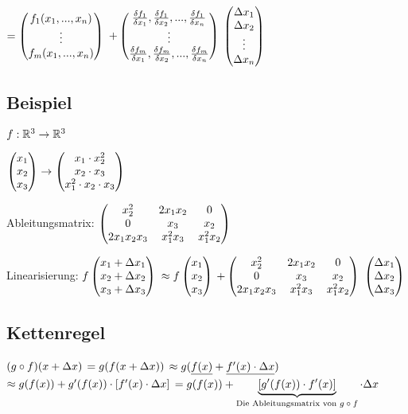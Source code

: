 $=  \begin{pmatrix} f_1(x_1,...,x_n)\\\vdots\\f_m(x_1,...,x_n) \end{pmatrix}  $
$+  \begin{pmatrix} \frac{\delta f_1}{\delta x_1}, \frac{\delta f_1}{\delta x_2}, ..., \frac{\delta f_1}{\delta x_n}\\ \vdots\\\frac{\delta f_m}{\delta x_1}, \frac{\delta f_m}{\delta x_2}, ..., \frac{\delta f_m}{\delta x_n} \end{pmatrix} $
$ \begin{pmatrix} \Delta x_1\\\Delta x_2\\\vdots\\\Delta x_n \end{pmatrix} $ 

\subsection{Beispiel}
$f : \mathbb{R}^3 \rightarrow \mathbb{R}^3$

$ \begin{pmatrix} x_1\\x_2\\x_3 \end{pmatrix}  \rightarrow  \begin{pmatrix} x_1 \cdot x_2^2\\ x_2 \cdot x_3 \\ x_1^2 \cdot x_2 \cdot x_3 \end{pmatrix} $

Ableitungsmatrix: 
$ \begin{pmatrix} x_2^2 & 2x_1 x_2 & 0\\ 0 & x_3 & x_2\\2 x_1 x_2 x_3 & x_1^2 x_3 & x_1^2 x_2 \end{pmatrix} $

Linearisierung: 
$f  \begin{pmatrix} x_1 + \Delta x_1\\ x_2 + \Delta x_2\\ x_3 + \Delta x_3 \end{pmatrix} $
$\approx f \begin{pmatrix} x_1\\ x_2 \\ x_3	 \end{pmatrix} $
$+ \begin{pmatrix} x_2^2 & 2x_1 x_2 & 0\\ 0 & x_3 & x_2\\2 x_1 x_2 x_3 & x_1^2 x_3 & x_1^2 x_2 \end{pmatrix} $
$ \begin{pmatrix} \Delta x_1\\ \Delta x_2\\ \Delta x_3 \end{pmatrix} $

\subsection{Kettenregel}
$ (g\circ f) (x+\Delta x) $
$=g(f(x+\Delta x))$
$\approx g(\underline{f(x)} + \underline{f'(x) \cdot \Delta x})$
$\approx g(f(x)) + g'(f(x)) \cdot [f'(x) \cdot \Delta x]$
$= g(f(x)) + \underbrace{[g'(f(x)) \cdot f'(x)]}_{\textrm{Die Ableitungsmatrix von $g\circ f$}} \cdot \Delta x$

